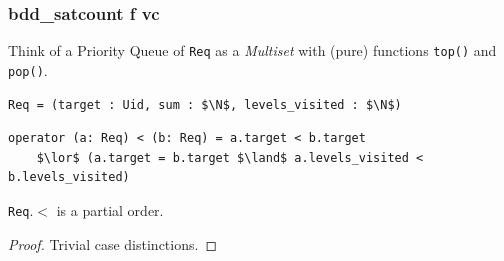 \documentclass[english, aspectratio=169]{beamer}
\begin{document}
\begin{frame}[t, fragile]
  \frametitle{bdd\_satcount f vc}

  Think of a Priority Queue of \texttt{Req} as a \emph{Multiset} with (pure) functions
  \texttt{top()} and \texttt{pop()}.

  \begin{lstlisting}
Req = (target : Uid, sum : $\N$, levels_visited : $\N$)
  \end{lstlisting}
  \begin{lstlisting}[firstnumber=2]
operator (a: Req) < (b: Req) = a.target < b.target
    $\lor$ (a.target = b.target $\land$ a.levels_visited < b.levels_visited)
  \end{lstlisting}

  \begin{lemma}
    \texttt{Req}.$<$ is a partial order.
  \end{lemma}
  \begin{proof}
    Trivial case distinctions.
  \end{proof}
\end{frame}
\end{document}
